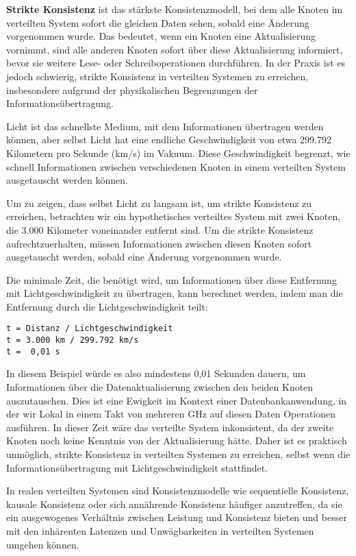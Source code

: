 \textbf{Strikte Konsistenz} ist das stärkste Konsistenzmodell, bei dem alle Knoten im verteilten System sofort die gleichen Daten sehen, sobald eine Änderung vorgenommen wurde. Das bedeutet, wenn ein Knoten eine Aktualisierung vornimmt, sind alle anderen Knoten sofort über diese Aktualisierung informiert, bevor sie weitere Lese- oder Schreiboperationen durchführen. In der Praxis ist es jedoch schwierig, strikte Konsistenz in verteilten Systemen zu erreichen, insbesondere aufgrund der physikalischen Begrenzungen der Informationsübertragung.

Licht ist das schnellste Medium, mit dem Informationen übertragen werden können, aber selbst Licht hat eine endliche Geschwindigkeit von etwa 299.792 Kilometern pro Sekunde (km/s) im Vakuum. Diese Geschwindigkeit begrenzt, wie schnell Informationen zwischen verschiedenen Knoten in einem verteilten System ausgetauscht werden können.

Um zu zeigen, dass selbst Licht zu langsam ist, um strikte Konsistenz zu erreichen, betrachten wir ein hypothetisches verteiltes System mit zwei Knoten, die 3.000 Kilometer voneinander entfernt sind. Um die strikte Konsistenz aufrechtzuerhalten, müssen Informationen zwischen diesen Knoten sofort ausgetauscht werden, sobald eine Änderung vorgenommen wurde.

Die minimale Zeit, die benötigt wird, um Informationen über diese Entfernung mit Lichtgeschwindigkeit zu übertragen, kann berechnet werden, indem man die Entfernung durch die Lichtgeschwindigkeit teilt:
\begin{lstlisting}[caption={Berechnung Lichtgeschwindigkeit},captionpos=b,label={lst:licht}]
t = Distanz / Lichtgeschwindigkeit
t = 3.000 km / 299.792 km/s
t =  0,01 s
\end{lstlisting}
In diesem Beispiel würde es also mindestens 0,01 Sekunden dauern, um Informationen über die Datenaktualisierung zwischen den beiden Knoten auszutauschen. Dies ist eine Ewigkeit im Kontext einer Datenbankanwendung, in der wir Lokal in einem Takt von mehreren GHz auf diesen Daten Operationen ausführen. In dieser Zeit wäre das verteilte System inkonsistent, da der zweite Knoten noch keine Kenntnis von der Aktualisierung hätte. Daher ist es praktisch unmöglich, strikte Konsistenz in verteilten Systemen zu erreichen, selbst wenn die Informationsübertragung mit Lichtgeschwindigkeit stattfindet.

In realen verteilten Systemen sind Konsistenzmodelle wie sequentielle Konsistenz, kausale Konsistenz oder sich annährende Konsistenz häufiger anzutreffen, da sie ein ausgewogenes Verhältnis zwischen Leistung und Konsistenz bieten und besser mit den inhärenten Latenzen und Unwägbarkeiten in verteilten Systemen umgehen können.

